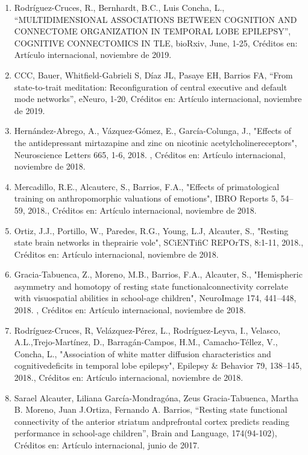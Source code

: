 \begin{enumerate}
\item Rodríguez-Cruces, R., Bernhardt, B.C., Luis Concha, L., “MULTIDIMENSIONAL ASSOCIATIONS BETWEEN COGNITION AND 
CONNECTOME 
ORGANIZATION IN TEMPORAL LOBE EPILEPSY”, COGNITIVE CONNECTOMICS IN TLE, bioRxiv, June, 1-25, Créditos en: Artículo 
internacional, noviembre de 2019.

\item CCC, Bauer, Whitfield-Gabrieli S, Díaz JL, Pasaye EH, Barrios FA, “From state-to-trait meditation: Reconfiguration of 
central executive and default mode networks”, eNeuro, 1-20, Créditos en: Artículo internacional, noviembre de 2019.

\item Hernández-Abrego, A., Vázquez-Gómez, E., García-Colunga, J., "Effects of the antidepressant mirtazapine and zinc on 
nicotinic acetylcholinereceptors", Neuroscience Letters 665, 1-6, 2018. , Créditos en: Artículo internacional, noviembre de 
2018.

\item Mercadillo, R.E., Alcauterc, S., Barrios, F.A., "Effects of primatological training on anthropomorphic valuations of 
emotions", IBRO Reports 5, 54–59, 2018., Créditos en: Artículo internacional, noviembre de 2018.

\item Ortiz, J.J., Portillo, W., Paredes, R.G., Young, L.J, Alcauter, S., "Resting state brain networks in theprairie 
vole", 
SCiENTifiC REPOrTS, 8:1-11, 2018., Créditos en: Artículo internacional, noviembre de 2018.

\item Gracia-Tabuenca, Z., Moreno, M.B., Barrios, F.A., Alcauter, S., "Hemispheric asymmetry and homotopy of resting state 
functionalconnectivity correlate with visuospatial abilities in school-age children", NeuroImage 174, 441–448, 2018. , 
Créditos en: Artículo internacional, noviembre de 2018.

\item Rodríguez-Cruces, R, Velázquez-Pérez, L., Rodríguez-Leyva, I., Velasco, A.L.,Trejo-Martínez, D., Barragán-Campos, 
H.M., 
Camacho-Téllez, V., Concha, L., "Association of white matter diffusion characteristics and cognitivedeficits in temporal 
lobe epilepsy", Epilepsy \& Behavior 79, 138–145, 2018., Créditos en: Artículo internacional, noviembre de 2018.

\item Sarael Alcauter, Liliana García-Mondragóna, Zeus Gracia-Tabuenca, Martha B. Moreno, Juan J.Ortiza, Fernando A. 
Barrios, 
“Resting state functional connectivity of the anterior striatum andprefrontal cortex predicts reading performance in 
school-age children”, Brain and Language, 174(94-102), Créditos en: Artículo internacional, junio de 2017.


\end{enumerate}
